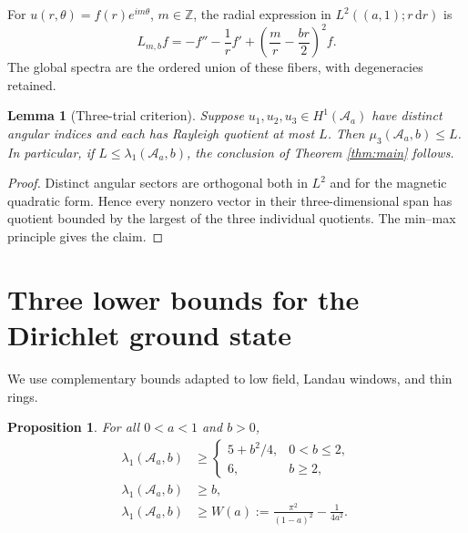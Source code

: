 \documentclass[11pt]{article}
\newtheorem{proposition}[theorem]{Proposition}
\newtheorem{lemma}[theorem]{Lemma}
\newcommand{\Aa}{\mathcal A_a}
\newcommand{\Z}{\mathbb Z}
\newcommand{\dd}{\,\mathrm d}
\begin{document}
For $u(r,\theta)=f(r)e^{im\theta}$, $m\in\Z$, the radial expression in
$L^2((a,1);r\dd r)$ is
\begin{equation}\label{eq:fiber}
 L_{m,b}f=-f''-\frac1r f'
       +\left(\frac mr-\frac{br}{2}\right)^2f.
\end{equation}
The global spectra are the ordered union of these fibers, with degeneracies
retained.

\begin{lemma}[Three-trial criterion]\label{lem:minmax}
Suppose $u_1,u_2,u_3\in H^1(\Aa)$ have distinct angular indices and each has
Rayleigh quotient at most $L$.  Then $\mu_3(\Aa,b)\leq L$.  In particular,
if $L\leq\lambda_1(\Aa,b)$, the conclusion of Theorem \ref{thm:main}
follows.
\end{lemma}

\begin{proof}
Distinct angular sectors are orthogonal both in $L^2$ and for the magnetic
quadratic form.  Hence every nonzero vector in their three-dimensional span
has quotient bounded by the largest of the three individual quotients.  The
min--max principle gives the claim.
\end{proof}

\section{Three lower bounds for the Dirichlet ground state}\label{sec:lower}

We use complementary bounds adapted to low field, Landau windows, and thin
rings.

\begin{proposition}\label{prop:lower}
For all $0<a<1$ and $b>0$,
\begin{align}
 \lambda_1(\Aa,b)&\geq
 \begin{cases}
  5+b^2/4,&0<b\leq2,\\
  6,&b\geq2,
 \end{cases}                                                     \label{eq:barta}\tag{2.1}\\
 \lambda_1(\Aa,b)&\geq b,                                      \label{eq:landau-lower}\tag{2.2}\\
 \lambda_1(\Aa,b)&\geq W(a):=
   \frac{\pi^2}{(1-a)^2}-\frac1{4a^2}.                         \label{eq:width}\tag{2.3}
\end{align}
\end{proposition}
\end{document}
